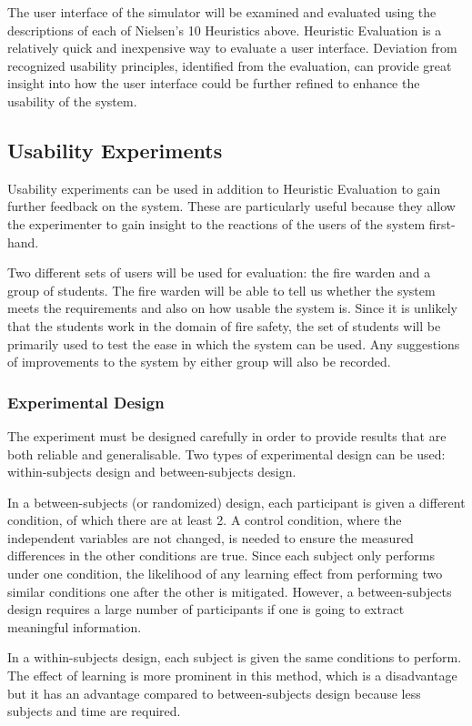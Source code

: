 \documentclass{article}
\begin{document}
The user interface of the simulator will be examined and evaluated using the descriptions of each of Nielsen’s 10 Heuristics above. Heuristic Evaluation is a relatively quick and inexpensive way to evaluate a user interface. Deviation from recognized usability principles, identified from the evaluation, can provide great insight into how the user interface could be further refined to enhance the usability of the system.

\subsection{Usability Experiments}
Usability experiments can be used in addition to Heuristic Evaluation to gain further feedback on the system. These are particularly useful because they allow the experimenter to gain insight to the reactions of the users of the system first-hand.

Two different sets of users will be used for evaluation: the fire warden and a group of students. The fire warden will be able to tell us whether the system meets the requirements and also on how usable the system is. Since it is unlikely that the students work in the domain of fire safety, the set of students will be primarily used to test the ease in which the system can be used. Any suggestions of improvements to the system by either group will also be recorded.

\subsubsection{Experimental Design}
The experiment must be designed carefully in order to provide results that are both reliable and generalisable. Two types of experimental design can be used: within-subjects design and between-subjects design.

In a between-subjects (or randomized) design, each participant is given a different condition, of which there are at least 2. A control condition, where the independent variables are not changed, is needed to ensure the measured differences in the other conditions are true. Since each subject only performs under one condition, the likelihood of any learning effect from performing two similar conditions one after the other is mitigated. However, a between-subjects design requires a large number of participants if one is going to extract meaningful information.

In a within-subjects design, each subject is given the same conditions to perform. The effect of learning is more prominent in this method, which is a disadvantage but it has an advantage compared to between-subjects design because less subjects and time are required.
\end{document}
